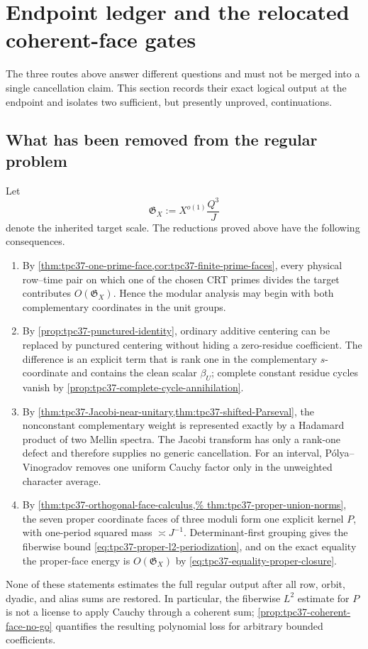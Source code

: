 \section{Endpoint ledger and the relocated coherent-face gates}
\label{sec:tpc37-next-gate}

The three routes above answer different questions and must not be merged
into a single cancellation claim.  This section records their exact
logical output at the endpoint and isolates two sufficient, but presently
unproved, continuations.

\subsection{What has been removed from the regular problem}

Let
\begin{equation}
 \mathfrak G_X:=X^{o(1)}\frac{Q^3}{J}
 \label{eq:tpc37-target-gate}
\end{equation}
denote the inherited target scale.  The reductions proved above have the
following consequences.
\begin{enumerate}[label=(\roman*)]
 \item By \cref{thm:tpc37-one-prime-face,cor:tpc37-finite-prime-faces},
 every physical row--time pair on which one of the chosen CRT primes
 divides the target contributes \(O(\mathfrak G_X)\).  Hence the modular
 analysis may begin with both complementary coordinates in the unit
 groups.
 \item By \cref{prop:tpc37-punctured-identity}, ordinary additive
 centering can be replaced by punctured centering without hiding a
 zero-residue coefficient.  The difference is an explicit term that is
 rank one in the complementary \(s\)-coordinate and contains the clean
 scalar \(\beta_U\); complete constant residue cycles
 vanish by \cref{prop:tpc37-complete-cycle-annihilation}.
 \item By \cref{thm:tpc37-Jacobi-near-unitary,thm:tpc37-shifted-Parseval},
 the nonconstant complementary weight is represented exactly by a
 Hadamard product of two Mellin spectra.  The Jacobi transform has only a
 rank-one defect and therefore supplies no generic cancellation.  For an
 interval, P\'olya--Vinogradov removes one uniform Cauchy factor only in
 the unweighted character average.
 \item By \cref{thm:tpc37-orthogonal-face-calculus,%
thm:tpc37-proper-union-norms}, the seven proper coordinate faces of three
 moduli form one explicit kernel \(P\), with one-period squared mass
 \(\asymp J^{-1}\).  Determinant-first grouping gives the fiberwise bound
 \eqref{eq:tpc37-proper-l2-periodization}, and on the exact equality the
 proper-face energy is \(O(\mathfrak G_X)\) by
 \eqref{eq:tpc37-equality-proper-closure}.
\end{enumerate}
None of these statements estimates the full regular output after all row,
orbit, dyadic, and alias sums are restored.  In particular, the
fiberwise \(L^2\) estimate for \(P\) is not a license to apply Cauchy
through a coherent sum; \cref{prop:tpc37-coherent-face-no-go} quantifies
the resulting polynomial loss for arbitrary bounded coefficients.

